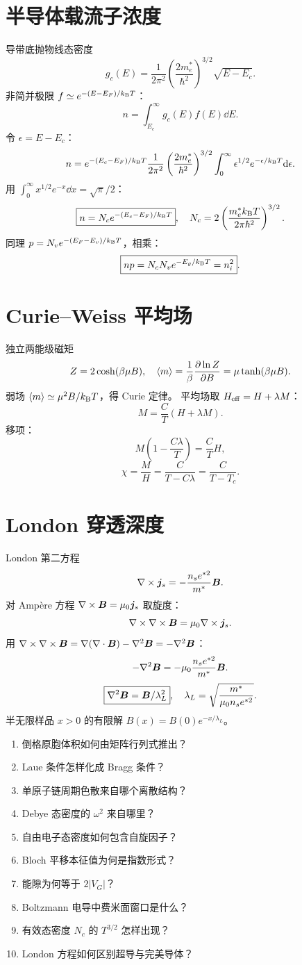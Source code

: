 \section{半导体载流子浓度}
导带底抛物线态密度
\[
g_c(E)=\frac1{2\pi^2}
\left(\frac{2m_e^*}{\hbar^2}\right)^{3/2}
\sqrt{E-E_c}.
\]
非简并极限
$f\simeq e^{-(E-E_F)/k_{\mathrm B} T}$：
\[
n=\int_{E_c}^\infty g_c(E)f(E)\dd E.
\]
令 $\epsilon=E-E_c$：
\[
n=e^{-(E_c-E_F)/k_{\mathrm B} T}
\frac1{2\pi^2}\left(\frac{2m_e^*}{\hbar^2}\right)^{3/2}
\int_0^\infty\epsilon^{1/2}e^{-\epsilon/k_{\mathrm B} T}\mathrm d\epsilon.
\]
用
$\int_0^\infty x^{1/2}e^{-x}\dd x=\sqrt\pi/2$：
\[
\boxed{n=N_ce^{-(E_c-E_F)/k_{\mathrm B} T}},
\quad
N_c=2\left(\frac{m_e^*k_{\mathrm B} T}{2\pi\hbar^2}\right)^{3/2}.
\]
同理
$p=N_ve^{-(E_F-E_v)/k_{\mathrm B} T}$，相乘：
\[
\boxed{np=N_cN_ve^{-E_g/k_{\mathrm B} T}=n_i^2}.
\]

\section{Curie--Weiss 平均场}
独立两能级磁矩
\[
Z=2\cosh(\beta\mu B),\quad
\langle m\rangle=\frac1\beta\frac{\partial \ln Z}{\partial B}
=\mu\tanh(\beta\mu B).
\]
弱场
$\langle m\rangle\simeq\mu^2B/k_{\mathrm B} T$，得 Curie 定律。
平均场取
$H_{\rm eff}=H+\lambda M$：
\[
M=\frac CT(H+\lambda M).
\]
移项：
\[
M\left(1-\frac{C\lambda}{T}\right)=\frac CT H,
\]
\[
\boxed{\chi=\frac MH=\frac C{T-C\lambda}
=\frac C{T-T_c}}.
\]

\section{London 穿透深度}
London 第二方程
\[
\nabla\times\bm{j}_s=-\frac{n_se^{*2}}{m^*}\bm{B}.
\]
对 Ampère 方程
$\nabla\times\bm{B}=\mu_0\bm{j}_s$ 取旋度：
\[
\nabla\times\nabla\times\bm{B}
=\mu_0\nabla\times\bm{j}_s.
\]
用
$\nabla\times\nabla\times\bm{B}
=\nabla(\nabla\cdot\bm{B})-\nabla^2\bm{B}=-\nabla^2\bm{B}$：
\[
-\nabla^2\bm{B}
=-\mu_0\frac{n_se^{*2}}{m^*}\bm{B}.
\]
\[
\boxed{\nabla^2\bm{B}=\bm{B}/\lambda_L^2},
\quad
\lambda_L=\sqrt{\frac{m^*}{\mu_0n_se^{*2}}}.
\]
半无限样品 $x>0$ 的有限解
$B(x)=B(0)e^{-x/\lambda_L}$。

\begin{selftestbox}
\begin{enumerate}
\item 倒格原胞体积如何由矩阵行列式推出？
\item Laue 条件怎样化成 Bragg 条件？
\item 单原子链周期色散来自哪个离散结构？
\item Debye 态密度的 $\omega^2$ 来自哪里？
\item 自由电子态密度如何包含自旋因子？
\item Bloch 平移本征值为何是指数形式？
\item 能隙为何等于 $2|V_G|$？
\item Boltzmann 电导中费米面窗口是什么？
\item 有效态密度 $N_c$ 的 $T^{3/2}$ 怎样出现？
\item London 方程如何区别超导与完美导体？
\end{enumerate}
\end{selftestbox}
